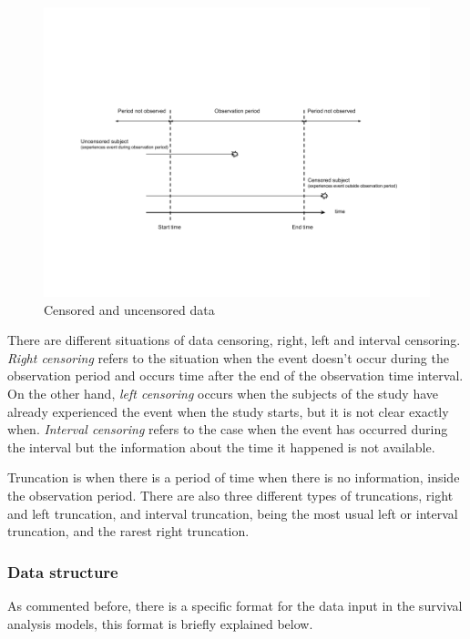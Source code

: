 \documentclass[11pt]{article} %
\begin{document}
      \begin{figure}[!h]
        \includegraphics[width=\textwidth]{Data_censoring.png}
        \caption{Censored and uncensored data}
        \label{img:data_censoring}
      \end{figure}

      There are different situations of data censoring, right, left and interval censoring. \emph{Right censoring} refers to the situation when the event doesn't occur during the observation period and occurs time after the end of the observation time interval. On the other hand, \emph{left censoring} occurs when the subjects of the study have already experienced the event when the study starts, but it is not clear exactly when. \emph{Interval censoring} refers to the case when the event has occurred during the interval but the information about the time it happened is not available.

      Truncation is when there is a period of time when there is no information, inside the observation period. There are also three different types of truncations, right and left truncation, and interval truncation, being the most usual left or interval truncation, and the rarest right truncation.

    \subsubsection{Data structure}

      As commented before, there is a specific format for the data input in the survival analysis models, this format is briefly explained below.
\end{document}
